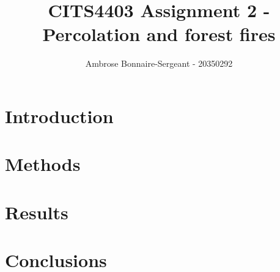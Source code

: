 \documentclass{article}
\title{CITS4403 Assignment 2 - Percolation and forest fires}
\author{Ambrose Bonnaire-Sergeant - 20350292}
\begin{document}
\maketitle

\section{Introduction} 

\section{Methods} 

\section{Results} 

\section{Conclusions}
\end{document}
